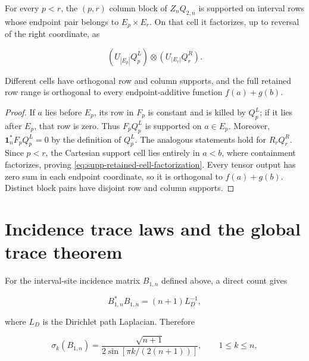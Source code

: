 \begin{lemma}
\label{lem:supp-retained-orthogonality}
For every \(p<r\), the \((p,r)\) column block of \(Z_nQ_{2,n}\) is
supported on interval rows whose endpoint pair belongs to
\(E_p\times E_r\).  On that cell it factorizes, up to reversal of the right
coordinate, as

\begin{equation}\label{eq:supp-retained-cell-factorization}
 (U_{|E_p|}Q_p^L)\otimes(U_{|E_r|}Q_r^R).
\end{equation}

Different cells have orthogonal row and column supports, and the full
retained row range is orthogonal to every endpoint-additive function
\(f(a)+g(b)\).
\end{lemma}

\begin{proof}
If \(a\) lies before \(E_p\), its row in \(F_p\) is constant and is killed
by \(Q_p^L\); if it lies after \(E_p\), that row is zero.  Thus
\(F_pQ_p^L\) is supported on \(a\in E_p\).  Moreover,
\(\mathbf1_n^*F_pQ_p^L=0\) by the definition of \(Q_p^L\).  The analogous
statements hold for \(R_rQ_r^R\).  Since \(p<r\), the Cartesian support cell
lies entirely in \(a<b\), where containment factorizes, proving
\eqref{eq:supp-retained-cell-factorization}.  Every tensor output has zero
sum in each endpoint coordinate, so it is orthogonal to \(f(a)+g(b)\).
Distinct block pairs have disjoint row and column supports.
\end{proof}

\section{Incidence trace laws and the global trace theorem}
\label{supp:trace-laws}

For the interval-site incidence matrix \(B_{1,n}\) defined above, a direct
count gives

\begin{equation}\label{eq:supp-b1-normal}
 B_{1,n}^*B_{1,n}=(n+1)L_D^{-1},
\end{equation}

where \(L_D\) is the Dirichlet path Laplacian.  Therefore

\begin{equation}\label{eq:supp-b1-singular-values}
 \sigma_k(B_{1,n})=
 \frac{\sqrt{n+1}}{2\sin[\pi k/(2(n+1))]},
 \qquad1\le k\le n,
\end{equation}

